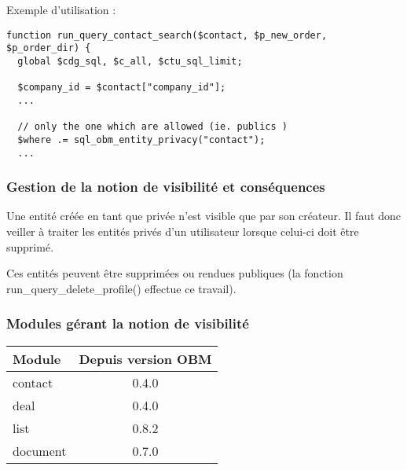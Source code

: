 Exemple d'utilisation :
\begin{verbatim}
function run_query_contact_search($contact, $p_new_order, $p_order_dir) {
  global $cdg_sql, $c_all, $ctu_sql_limit;

  $company_id = $contact["company_id"];
  ...

  // only the one which are allowed (ie. publics )
  $where .= sql_obm_entity_privacy("contact");
  ...
\end{verbatim}


\subsubsection{Gestion de la notion de visibilité et conséquences}

Une entité créée en tant que privée n'est visible que par son créateur.
Il faut donc veiller à traiter les entités privés d'un utilisateur lorsque celui-ci doit être supprimé.

Ces entités peuvent être supprimées ou rendues publiques (la fonction run\_query\_delete\_profile() effectue ce travail).


\subsubsection{Modules gérant la notion de visibilité}

\begin{tabular}{|p{5cm}|c|}
\hline
\textbf{Module} & \textbf{Depuis version OBM} \\
\hline
contact & 0.4.0 \\
\hline
deal & 0.4.0 \\
\hline
list & 0.8.2 \\
\hline
document & 0.7.0 \\
\hline
\end{tabular}